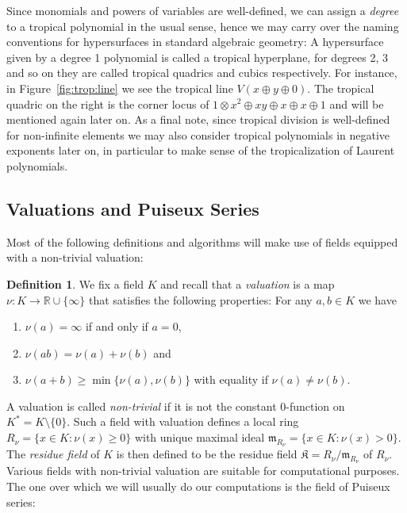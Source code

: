 \documentclass[
  paper=a4,
  titlepage,
  bibliography=totoc,
  pagesize=pdftex
]{scrartcl}
\numberwithin{figure}{section}
\numberwithin{equation}{section}
\numberwithin{table}{section}
\newcommand*\setR{\mathds{R}}
\theoremstyle{definition}
\newtheorem{definition}{Definition}
\numberwithin{definition}{section}
\begin{document}
Since monomials and powers of variables are well-defined, we can assign a \emph{degree} to
a tropical polynomial in the usual sense, hence we may carry over the naming conventions
for hypersurfaces in standard algebraic geometry: A hypersurface given by a degree 1
polynomial is called a tropical hyperplane, for degrees 2, 3 and so on they are called
tropical quadrics and cubics respectively. For instance, in Figure~\ref{fig:trop:line} we
see the tropical line $V(x \oplus y \oplus 0)$. The tropical quadric on the right is the
corner locus of $1\otimes x^2 \oplus xy \oplus x \oplus x \oplus 1$ and will be mentioned
again later on. As a final note, since tropical division is well-defined for non-infinite
elements we may also consider tropical polynomials in negative exponents later on, in
particular to make sense of the tropicalization of Laurent polynomials.

\subsection{Valuations and Puiseux Series}

Most of the following definitions and algorithms will make use of fields equipped with a
non-trivial valuation:

\begin{definition} \label{def:val}
  We fix a field $K$ and recall that a \emph{valuation} is a map $\nu:K\to \setR \cup
  \{\infty\}$ that satisfies the following properties: For any $a, b \in K$ we have
  \begin{enumerate}
    \item $\nu(a) = \infty$ if and only if $a=0$,
    \item $\nu(ab) = \nu(a)+\nu(b)$ and
    \item $\nu(a+b) \geq \min\{\nu(a), \nu(b)\}$ with equality if $\nu(a)\neq \nu(b)$.
      \label{def:val:eq}
  \end{enumerate}
\end{definition}

A valuation is called \emph{non-trivial} if it is not the constant 0-function on $K^* =
K\setminus\{0\}$. Such a field with valuation defines a local ring $R_\nu = \{ x \in K :
\nu(x) \geq 0 \}$ with unique maximal ideal $\mathfrak m_{R_\nu} = \{ x \in K : \nu(x) > 0
\}$. The \emph{residue field} of $K$ is then defined to be the residue field $\mathfrak K
= R_\nu/\mathfrak m_{R_\nu}$ of $R_\nu$. Various fields with non-trivial valuation are
suitable for computational purposes. The one over which we will usually do our
computations is the field of Puiseux series:
\end{document}
